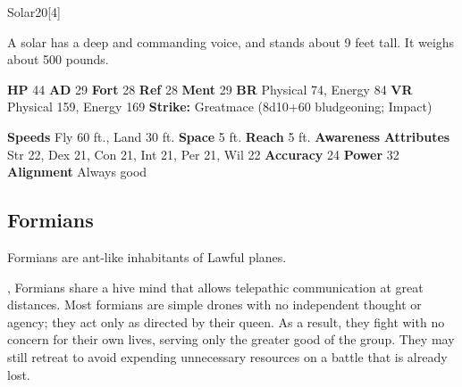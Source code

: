   \begin{monsubsection}{Solar}{20}[4]
    \vspace{-1em}\vspace{-1em}
    \vspace{0em}

    
          A solar has a deep and commanding voice, and stands about 9 feet tall. It weighs about 500 pounds.
        

    \begin{spellcontent}
      \begin{spelltargetinginfo}
        \pari \textbf{HP} 44 \monsep
          \textbf{AD} 29 \monsep
          \textbf{Fort} 28 \monsep
          \textbf{Ref} 28 \monsep
          \textbf{Ment} 29
        \pari \textbf{BR} Physical 74, Energy 84 \monsep
        \textbf{VR} Physical 159, Energy 169
        \pari \textbf{Strike:}
            Greatmace  (8d10+60 bludgeoning; Impact)
      \end{spelltargetinginfo}
    \end{spellcontent}
    \begin{monsterfooter}
      \pari \textbf{Speeds} Fly 60 ft., Land 30 ft. \monsep
        \textbf{Space} 5 ft. \monsep
        \textbf{Reach} 5 ft.
      \pari \textbf{Awareness} 
      \pari \textbf{Attributes}
        Str 22, Dex 21,
        Con 21, Int 21,
        Per 21, Wil 22
      \pari \textbf{Accuracy} 24 \monsep
        \textbf{Power} 32
      \pari \textbf{Alignment} Always good
    \end{monsterfooter}
  \end{monsubsection}
  
  
  
    \subsection{Formians}
      
      Formians are ant-like inhabitants of Lawful planes.
    
 ,
      Formians share a hive mind that allows telepathic communication at great distances.
      Most formians are simple drones with no independent thought or agency; they act only as directed by their queen.
      As a result, they fight with no concern for their own lives, serving only the greater good of the group.
      They may still retreat to avoid expending unnecessary resources on a battle that is already lost.
    
